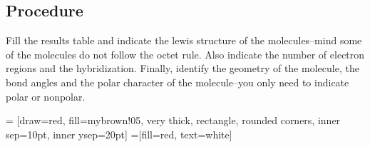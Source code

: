 \documentclass[cover.tex]{subfiles}
\begin{document}
\begin{refsection}
\section*{Procedure}
Fill the results table and indicate the lewis structure of the molecules--mind some of the molecules do not follow the octet rule. Also indicate the number of electron regions and the hybridization. Finally, identify the geometry of the molecule, the bond angles and the polar character of the molecule--you only need to indicate polar or nonpolar.

\begin{center} = [draw=red, fill=mybrown!05, very thick,
    rectangle, rounded corners, inner sep=10pt, inner ysep=20pt]
 =[fill=red, text=white]
\end{center}

       







        
    



  



















       
       
   
    










\end{refsection}
\end{document}

